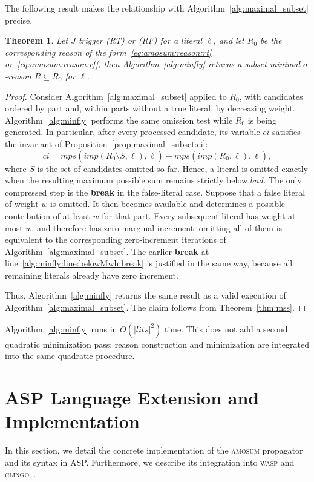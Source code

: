 \documentclass[preprint,authoryear]{elsarticle}
\newcommand{\lits}{\mathit{lits}}
\newcommand{\mps}{\mathit{mps}}
\newcommand{\bnd}{\mathit{bnd}}
\newtheorem{theorem}{Theorem}[section]
\theoremstyle{definition}
\begin{document}
{The following result makes the relationship with Algorithm~\ref{alg:maximal_subset} precise.
\begin{theorem}\label{thm:mrf}
Let $J$ trigger (RT) or (RF) for a literal $\ell$, and let $R_0$ be the corresponding reason of the form~\eqref{eq:amosum:reason:rt} or~\eqref{eq:amosum:reason:rf}, then Algorithm~\ref{alg:minfly} returns a subset-minimal $\sigma$-reason $R\subseteq R_0$ for $\ell$.
\end{theorem}
\begin{proof}
Consider Algorithm~\ref{alg:maximal_subset} applied to $R_0$, with candidates ordered by part and, within parts without a true literal, by decreasing weight. Algorithm~\ref{alg:minfly} performs the same omission test while $R_0$ is being generated. In particular, after every processed candidate, its variable $\mathit{ci}$ satisfies the invariant of Proposition~\ref{prop:maximal_subset:ci}:
$$
\mathit{ci}=\mps(\mathit{imp}(R_0\setminus S,\ell),\overline{\ell})-\mps(\mathit{imp}(R_0,\ell),\overline{\ell}),
$$
where $S$ is the set of candidates omitted so far. Hence, a literal is omitted exactly when the resulting maximum possible sum remains strictly below $\bnd$.
The only compressed step is the \textbf{break} in the false-literal case. Suppose that a false literal of weight $w$ is omitted. It then becomes available and determines a possible contribution of at least $w$ for that part. Every subsequent literal has weight at most $w$, and therefore has zero marginal increment; omitting all of them is equivalent to the corresponding zero-increment iterations of Algorithm~\ref{alg:maximal_subset}. The earlier \textbf{break} at line~\ref{alg:minfly:line:belowMwh:break} is justified in the same way, because all remaining literals already have zero increment.

Thus, Algorithm~\ref{alg:minfly} returns the same result as a valid execution of Algorithm~\ref{alg:maximal_subset}. The claim follows from Theorem~\ref{thm:mss}.
\end{proof}

Algorithm~\ref{alg:minfly} runs in $O(|\lits|^2)$ time. This does not add a second quadratic minimization pass: reason construction and minimization are integrated into the same quadratic procedure.


}


\section{ASP Language Extension and Implementation}
\label{sec:language-extension}
In this section, we detail the concrete implementation of the \textsc{amosum} propagator and its syntax in ASP.
Furthermore, we describe its integration into \textsc{wasp} and \textsc{clingo}~\citep{DBLP:conf/iclp/GebserKKOSW16}.
\end{document}
